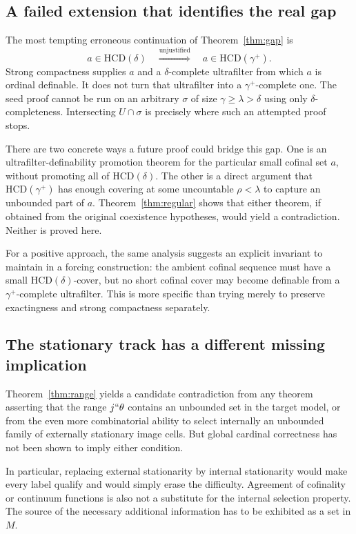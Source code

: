 \documentclass[11pt,letterpaper]{article}
\theoremstyle{definition}
\newcommand{\HCD}{\mathrm{HCD}}
\theoremstyle{remark}
\begin{document}
\subsection{A failed extension that identifies the real gap}

The most tempting erroneous continuation of Theorem~\ref{thm:gap} is
\[
 a\in\HCD(\delta)
 \quad\overset{\text{unjustified}}{\Longrightarrow}\quad
 a\in\HCD(\gamma^+).
\]
Strong compactness supplies $a$ and a $\delta$-complete ultrafilter from which $a$ is ordinal definable. It does not turn that ultrafilter into a $\gamma^+$-complete one. The seed proof cannot be run on an arbitrary $\sigma$ of size $\gamma\geq\lambda>\delta$ using only $\delta$-completeness. Intersecting $U\cap\sigma$ is precisely where such an attempted proof stops.

There are two concrete ways a future proof could bridge this gap. One is an ultrafilter-definability promotion theorem for the particular small cofinal set $a$, without promoting all of $\HCD(\delta)$. The other is a direct argument that $\HCD(\gamma^+)$ has enough covering at some uncountable $\rho<\lambda$ to capture an unbounded part of $a$. Theorem~\ref{thm:regular} shows that either theorem, if obtained from the original coexistence hypotheses, would yield a contradiction. Neither is proved here.

For a positive approach, the same analysis suggests an explicit invariant to maintain in a forcing construction: the ambient cofinal sequence must have a small $\HCD(\delta)$-cover, but no short cofinal cover may become definable from a $\gamma^+$-complete ultrafilter. This is more specific than trying merely to preserve exactingness and strong compactness separately.

\subsection{The stationary track has a different missing implication}

Theorem~\ref{thm:range} yields a candidate contradiction from any theorem asserting that the range $j``\theta$ contains an unbounded set in the target model, or from the even more combinatorial ability to select internally an unbounded family of externally stationary image cells. But global cardinal correctness has not been shown to imply either condition.

In particular, replacing external stationarity by internal stationarity would make every label qualify and would simply erase the difficulty. Agreement of cofinality or continuum functions is also not a substitute for the internal selection property. The source of the necessary additional information has to be exhibited as a set in $M$.
\end{document}

